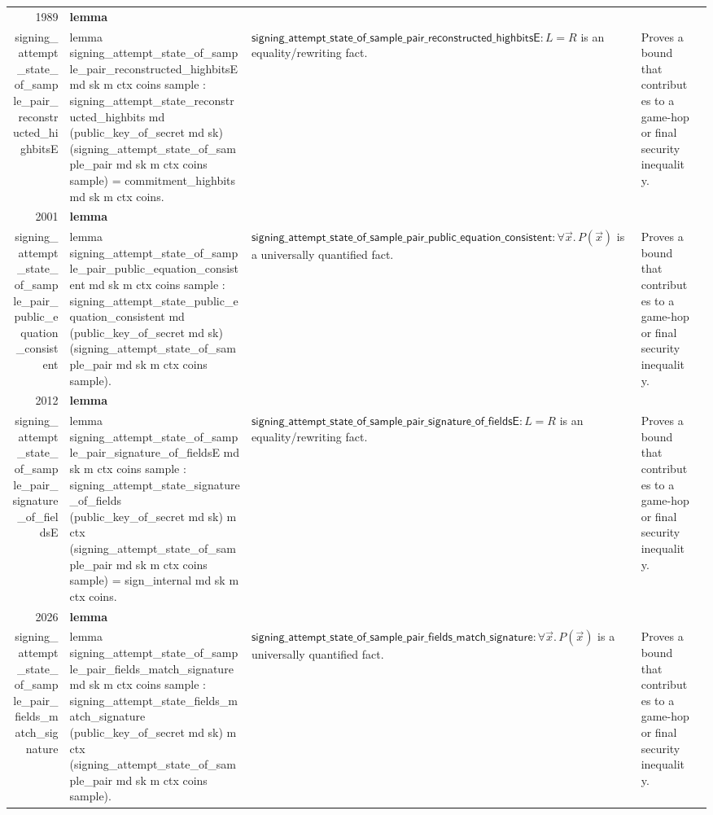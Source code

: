 \documentclass[10pt]{article}
\newcommand{\ec}[1]{\begingroup\ttfamily\scriptsize #1\endgroup}
\begin{document}
\begin{longtable}{r L{0.17\textwidth} L{0.26\textwidth} L{0.27\textwidth} L{0.20\textwidth}}
1989 & \textbf{lemma}\\\ec{signing\_attempt\_state\_of\_sample\_pair\_reconstructed\_highbitsE} & \ec{lemma signing\_attempt\_state\_of\_sample\_pair\_reconstructed\_highbitsE md sk m ctx coins sample : signing\_attempt\_state\_reconstructed\_highbits md (public\_key\_of\_secret md sk) (signing\_attempt\_state\_of\_sample\_pair md sk m ctx coins sample) = commitment\_highbits md sk m ctx coins.} & \(\mathsf{signing\_attempt\_state\_of\_sample\_pair\_reconstructed\_highbitsE} : L = R\) is an equality/rewriting fact. & Proves a bound that contributes to a game-hop or final security inequality. \\
2001 & \textbf{lemma}\\\ec{signing\_attempt\_state\_of\_sample\_pair\_public\_equation\_consistent} & \ec{lemma signing\_attempt\_state\_of\_sample\_pair\_public\_equation\_consistent md sk m ctx coins sample : signing\_attempt\_state\_public\_equation\_consistent md (public\_key\_of\_secret md sk) (signing\_attempt\_state\_of\_sample\_pair md sk m ctx coins sample).} & \(\mathsf{signing\_attempt\_state\_of\_sample\_pair\_public\_equation\_consistent} : \forall \vec{x}.\, P(\vec{x})\) is a universally quantified fact. & Proves a bound that contributes to a game-hop or final security inequality. \\
2012 & \textbf{lemma}\\\ec{signing\_attempt\_state\_of\_sample\_pair\_signature\_of\_fieldsE} & \ec{lemma signing\_attempt\_state\_of\_sample\_pair\_signature\_of\_fieldsE md sk m ctx coins sample : signing\_attempt\_state\_signature\_of\_fields (public\_key\_of\_secret md sk) m ctx (signing\_attempt\_state\_of\_sample\_pair md sk m ctx coins sample) = sign\_internal md sk m ctx coins.} & \(\mathsf{signing\_attempt\_state\_of\_sample\_pair\_signature\_of\_fieldsE} : L = R\) is an equality/rewriting fact. & Proves a bound that contributes to a game-hop or final security inequality. \\
2026 & \textbf{lemma}\\\ec{signing\_attempt\_state\_of\_sample\_pair\_fields\_match\_signature} & \ec{lemma signing\_attempt\_state\_of\_sample\_pair\_fields\_match\_signature md sk m ctx coins sample : signing\_attempt\_state\_fields\_match\_signature (public\_key\_of\_secret md sk) m ctx (signing\_attempt\_state\_of\_sample\_pair md sk m ctx coins sample).} & \(\mathsf{signing\_attempt\_state\_of\_sample\_pair\_fields\_match\_signature} : \forall \vec{x}.\, P(\vec{x})\) is a universally quantified fact. & Proves a bound that contributes to a game-hop or final security inequality. \\

\end{longtable}
\end{document}
